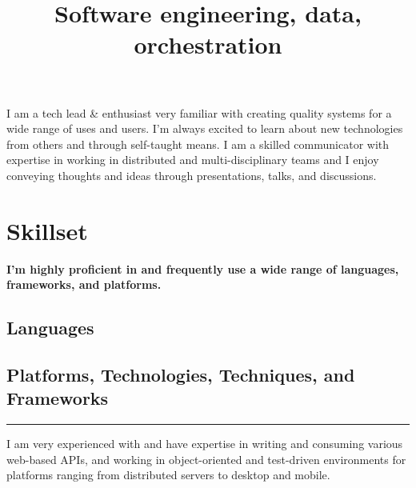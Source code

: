 \documentclass[11pt,a4paper,sans]{moderncv} %
\title{\small{Software engineering, data, orchestration}}
\begin{document}
\makecvtitle

\vspace{-1cm}

\parbox[b][5em][t]{1.0\textwidth}{I am a tech lead \& enthusiast very familiar with creating quality systems for a wide range of uses and users. I'm always excited to learn about new technologies from others and through self-taught means. I am a skilled communicator with expertise in working in distributed and multi-disciplinary teams and I enjoy conveying thoughts and ideas through presentations, talks, and discussions.}

\section{Skillset}
\textbf{I'm highly proficient in and frequently use a wide range of languages, frameworks, and platforms.}
	\subsection{Languages}

	\subsection{Platforms, Technologies, Techniques, and Frameworks}
        {\color{gray} \rule{\linewidth}{0.1mm} }
        
        \parbox[b][4em][t]{\textwidth}{I am very experienced with and have expertise in writing and consuming various web-based APIs, and working in object-oriented and test-driven environments for platforms ranging from distributed servers to desktop and mobile.}

	
\end{document}

